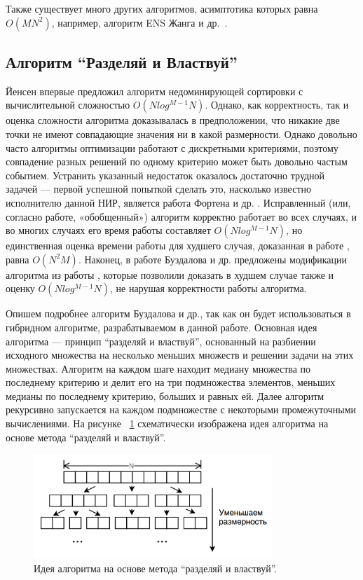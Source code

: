 Также существует много других алгоритмов, асимптотика которых равна $O(MN^2)$, например, алгоритм ENS Жанга и др.~\cite{Zhang}.

\subsection{Алгоритм ``Разделяй и Властвуй''}

Йенсен \cite{Jensen} впервые предложил алгоритм недоминирующей сортировки с вычислительной сложностью $O(N log^{M-1} N)$. Однако, как корректность, так и оценка сложности алгоритма доказывалась в предположении, что никакие две точки не имеют совпадающие значения ни в какой размерности. Однако довольно часто алгоритмы оптимизации работают с дискретными критериями, поэтому совпадение разных решений по одному критерию может быть довольно частым событием. Устранить указанный недостаток оказалось достаточно трудной задачей — первой успешной попыткой сделать это, насколько известно исполнителю данной НИР, является работа Фортена и др. \cite{Forton}. Исправленный (или, согласно работе, «обобщенный») алгоритм корректно работает во всех случаях, и во многих случаях его время работы составляет $O(N log^{M-1} N)$, но единственная оценка времени работы для худшего случая, доказанная в работе \cite{Jensen}, равна $O(N^2M)$. Наконец, в работе Буздалова и др. \cite{Buzdalov} предложены модификации алгоритма из работы \cite{Jensen}, которые позволили доказать в худшем случае также и оценку $O(N log^{M-1} N)$, не нарушая корректности работы алгоритма.

Опишем подробнее алгоритм Буздалова и др., так как он будет использоваться в гибридном алгоритме, разрабатываемом в данной работе. Основная идея алгоритма {---} принцип ``разделяй и властвуй'', основанный на разбиении исходного множества на несколько меньших множеств и решении задачи на этих множествах. Алгоритм на каждом шаге находит медиану множества по последнему критерию и делит его на три подмножества элементов, меньших медианы по последнему критерию, больших и равных ей. Далее алгоритм рекурсивно запускается на каждом подмножестве с некоторыми промежуточными вычислениями. На рисунке ~\ref{fast_pic} схематически изображена идея алгоритма на основе метода ``разделяй и властвуй''.

\begin{figure}[!h]
\begin{center}
\includegraphics[width=9cm]{pic/fast_pic.png}
\caption{Идея алгоритма на основе метода ``разделяй и властвуй''.}
\label{fast_pic}
\end{center}
\end{figure}

